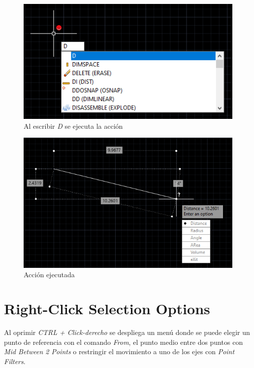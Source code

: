 \documentclass{report}
\begin{document}
\begin{figure}[H]
	\centering
	\includegraphics[width=0.95\linewidth, height=0.5\textheight,keepaspectratio]{Imagenes/autocad_measuregeom04}
	\caption{Al escribir \emph{D} se ejecuta la acción}
	\label{fig:autocadmeasuregeom04}
\end{figure}

\begin{figure}[H]
	\centering
	\includegraphics[width=0.95\linewidth, height=0.5\textheight,keepaspectratio]{Imagenes/autocad_measuregeom05}
	\caption{Acción ejecutada}
	\label{fig:autocadmeasuregeom05}
\end{figure}


\chapter{Right-Click Selection Options}

Al oprimir \emph{CTRL + Click-derecho} se despliega un menú donde se puede elegir un punto de referencia con el comando \emph{From}, el punto medio entre dos puntos con \emph{Mid Between 2 Points} o restringir el movimiento a uno de los ejes con \emph{Point Filters}.
\end{document}

